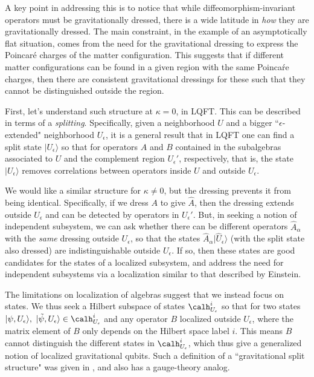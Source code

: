 A key point in addressing this is to notice that while diffeomorphism-invariant operators must be gravitationally dressed, there is a wide latitude in {\it how} they are gravitationally dressed.  The main constraint, in the example of an asymptotically flat situation, comes from the need for the gravitational dressing to express the Poincar\'e charges of the matter configuration.  This suggests that if different matter configurations can be found in a given region  with the same Poinca\'re charges, then there are consistent gravitational dressings for these such that they cannot be distinguished outside the region.

First, let's understand such structure at $\kappa=0$, in LQFT.  This can be described in terms of a {\it splitting}.  Specifically, given a neighborhood $U$ and a bigger ``$\epsilon$-extended" neighborhood $U_\epsilon$, it is a general result that in LQFT one can find a split state $|U_\epsilon\rangle$ so that for operators $A$ and $B$ contained in the subalgebras associated to $U$ and the complement region $U_\epsilon'$, respectively, 
%
\eqn{}
%
that is, the state  $|U_\epsilon\rangle$ removes correlations between operators inside $U$ and outside $U_\epsilon$.

We would like a similar structure for $\kappa\neq0$, but the dressing prevents it from being identical.  Specifically, if we dress $A$ to give $\hat A$, then the dressing extends outside $U_\epsilon$ and can be detected by operators in $U_\epsilon'$.  But, in seeking a notion of independent subsystem, we can ask whether there can be different operators $\hat A_\alpha$ with the {\it same} dressing outside $U_\epsilon$, so that the states $\hat A_\alpha |\hat U_\epsilon\rangle$ (with the split state also dressed) are indistinguishable outside $U_\epsilon$.  If so, then these states are good candidates for the states of a localized subsystem, and address the need for independent subsystems via a localization similar to that described by Einstein.

The limitations on localization of algebras suggest that we instead focus on states.  We thus seek a Hilbert subspace of states $\calh^i_{U_\epsilon}$ so that for two states $|\psi,U_\epsilon \rangle,\ |\tilde \psi,U_\epsilon \rangle\in \calh^i_{U_\epsilon}$ and any operator $B$ localized outside $U_\epsilon$, 
%
\eqn{}
%
where the matrix element of $B$ only depends on the Hilbert space label $i$.  This means $B$ cannot distinguish the different states in $\calh^i_{U_\epsilon}$, which thus give a generalized notion of localized gravitational qubits.  Such a definition of a ``gravitational split structure" was given in , and also has a gauge-theory analog.

